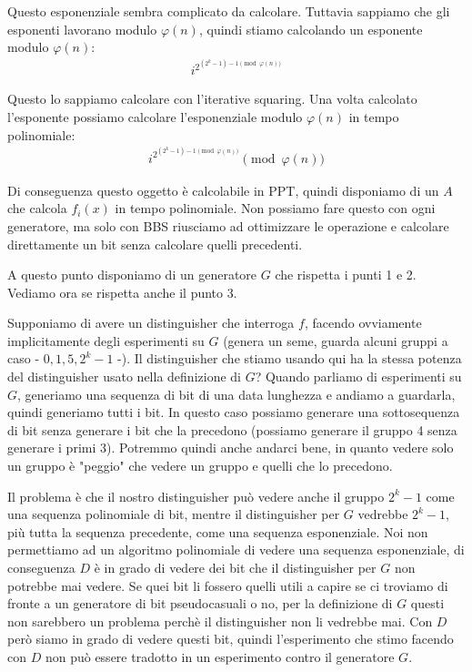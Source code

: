 \noindent Questo esponenziale sembra complicato da calcolare. Tuttavia sappiamo che gli esponenti lavorano modulo $\varphi(n)$, quindi stiamo calcolando un esponente modulo $\varphi(n)$:
\begin{align*}
    i^{2^{(2^k-1)-1 \pmod{\varphi(n)}}}
\end{align*}

\noindent Questo lo sappiamo calcolare con l'iterative squaring. Una volta calcolato l'esponente possiamo calcolare l'esponenziale modulo $\varphi(n)$ in tempo polinomiale:
\begin{align*}
    i^{2^{(2^k-1)-1 \pmod{\varphi(n)}}} \pmod{\varphi(n)}
\end{align*}

\noindent Di conseguenza questo oggetto è calcolabile in PPT, quindi disponiamo di un $A$ che calcola $f_i(x)$ in tempo polinomiale. Non possiamo fare questo con ogni generatore, ma solo con BBS riusciamo ad ottimizzare le operazione e calcolare direttamente un bit senza calcolare quelli precedenti. 

\noindent A questo punto disponiamo di un generatore $G$ che rispetta i punti 1 e 2. Vediamo ora se rispetta anche il punto 3.

Supponiamo di avere un distinguisher che interroga $f$, facendo ovviamente implicitamente degli esperimenti su $G$ (genera un seme, guarda alcuni gruppi a caso - $0, 1, 5, 2^k-1$ -). Il distinguisher che stiamo usando qui ha la stessa potenza del distinguisher usato nella definizione di $G$? Quando parliamo di esperimenti su $G$, generiamo una sequenza di bit di una data lunghezza e andiamo a guardarla, quindi generiamo tutti i bit. In questo caso possiamo generare una sottosequenza di bit senza generare i bit che la precedono (possiamo generare il gruppo 4 senza generare i primi 3). Potremmo quindi anche andarci bene, in quanto vedere solo un gruppo è "peggio" che vedere un gruppo e quelli che lo precedono.

Il problema è che il nostro distinguisher può vedere anche il gruppo $2^k-1$ come una sequenza polinomiale di bit, mentre il distinguisher per $G$ vedrebbe $2^k-1$, più tutta la sequenza precedente, come una sequenza esponenziale. Noi non permettiamo ad un algoritmo polinomiale di vedere una sequenza esponenziale, di conseguenza $D$ è in grado di vedere dei bit che il distinguisher per $G$ non potrebbe mai vedere. Se quei bit li fossero quelli utili a capire se ci troviamo di fronte a un generatore di bit pseudocasuali o no, per la definizione di $G$ questi non sarebbero un problema perchè il distinguisher non li vedrebbe mai. Con $D$ però siamo in grado di vedere questi bit, quindi l'esperimento che stimo facendo con $D$ non può essere tradotto in un esperimento contro il generatore $G$. 


